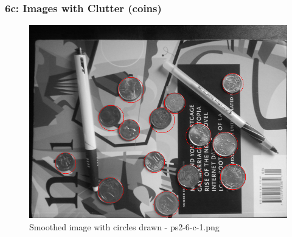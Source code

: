     \begin{frame}
		\frametitle{6c: Images with Clutter (coins)}
		
		\begin{figure}[!htb]
			\centering
			\includegraphics[height=0.65\textheight]{./output/ps2-6-c-1.png}
			\caption{Smoothed image with circles drawn - ps2-6-c-1.png} 
		\end{figure}	
		
	\end{frame}
    
